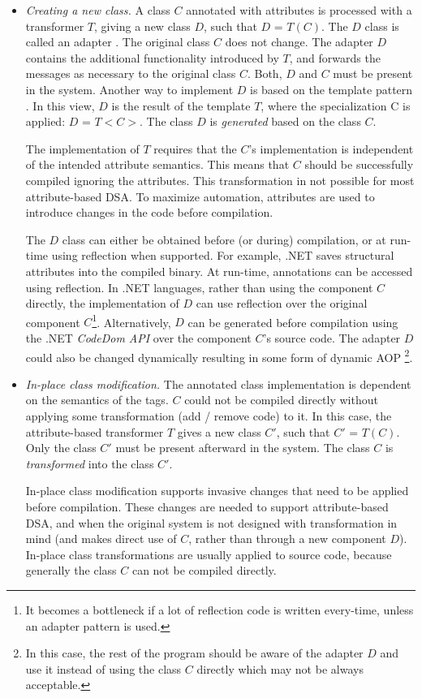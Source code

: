 \begin{itemize}
\item \textit{Creating a new class.} A class $C$ annotated with attributes is processed with a transformer $T$, giving a new class $D$, such that $D$ = $T(C)$. The $D$ class is called an adapter \cite{dpatterns}. The original class $C$ does not change. The adapter $D$ contains the additional functionality introduced by $T$, and forwards the messages as necessary to the original class $C$. Both, $D$ and $C$ must be present in the system. Another way to implement $D$ is based on the template pattern \cite{dpatterns}. In this view, $D$ is the result of the template $T$, where the specialization C is applied: $D$ = $T<C>$. The class $D$ is \textit{generated} based on the class $C$.

The implementation of $T$ requires that the $C$'s implementation is independent of the intended attribute semantics. This means that $C$ should be successfully compiled ignoring the attributes. This transformation in not possible for most attribute-based DSA. To maximize automation, attributes are used to introduce changes in the code before compilation.

The $D$ class can either be obtained before (or during) compilation, or at run-time using reflection when supported. For example, .NET saves structural attributes into the compiled binary. At run-time, annotations can be accessed using reflection. In .NET languages, rather than using the component $C$ directly, the implementation of $D$ can use reflection over the original component $C$\footnote{It becomes a bottleneck if a lot of reflection code is written every-time, unless an adapter pattern \cite{dpatterns} is used.}. Alternatively, $D$ can be generated before compilation using the .NET \textit{CodeDom API} \cite{cdom} over the component $C$'s source code. The adapter $D$ could also be changed dynamically resulting in some form of dynamic AOP \cite{kiczalesetal.97}\footnote{In this case, the rest of the program should be aware of the adapter $D$ and use it instead of using the class $C$ directly which may not be always acceptable.}.

\item \textit{In-place class modification.} The annotated class implementation is dependent on the semantics of the tags. $C$ could not be compiled directly without applying some transformation (add / remove code) to it. In this case, the attribute-based transformer $T$ gives a new class $C'$, such that $C'$ = $T(C)$. Only the class $C'$ must be present afterward in the system. The class $C$ is \textit{transformed} into the class $C'$.

In-place class modification supports invasive changes that need to be applied before compilation. These changes are needed to support attribute-based DSA, and when the original system is not designed with transformation in mind (and makes direct use of $C$, rather than through a new component $D$).
In-place class transformations are usually applied to source code, because generally the class $C$ can not be compiled directly.
\end{itemize}

